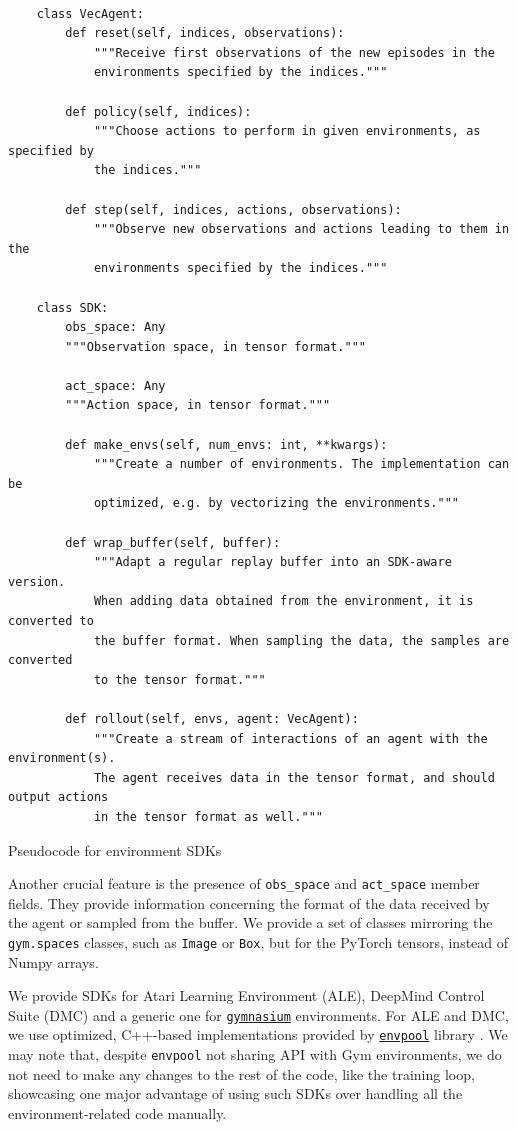 \documentclass[en]{pracamgr}
\begin{document}
\begin{listing}
  \begin{verbatim}

    class VecAgent:
        def reset(self, indices, observations):
            """Receive first observations of the new episodes in the
            environments specified by the indices."""
        
        def policy(self, indices):
            """Choose actions to perform in given environments, as specified by
            the indices."""
        
        def step(self, indices, actions, observations):
            """Observe new observations and actions leading to them in the 
            environments specified by the indices."""

    class SDK:
        obs_space: Any
        """Observation space, in tensor format."""
        
        act_space: Any
        """Action space, in tensor format."""

        def make_envs(self, num_envs: int, **kwargs):
            """Create a number of environments. The implementation can be
            optimized, e.g. by vectorizing the environments."""
        
        def wrap_buffer(self, buffer):
            """Adapt a regular replay buffer into an SDK-aware version.
            When adding data obtained from the environment, it is converted to 
            the buffer format. When sampling the data, the samples are converted
            to the tensor format."""
        
        def rollout(self, envs, agent: VecAgent):
            """Create a stream of interactions of an agent with the environment(s).
            The agent receives data in the tensor format, and should output actions
            in the tensor format as well."""
  \end{verbatim}
  \caption{Pseudocode for environment SDKs}
  \label{lst:env_sdk}
\end{listing}

Another crucial feature is the presence of {\tt obs\_space} and {\tt act\_space} member fields. They provide information concerning the format of the data received by the agent or sampled from the buffer. We provide a set of classes mirroring the {\tt gym.spaces} classes, such as {\tt Image} or {\tt Box}, but for the PyTorch tensors, instead of Numpy arrays.

We provide SDKs for Atari Learning Environment (ALE), DeepMind Control Suite (DMC) and a generic one for \href{https://gymnasium.farama.org/}{\tt gymnasium} environments. For ALE and DMC, we use optimized, C++-based implementations provided by \href{https://github.com/sail-sg/envpool}{\tt envpool} library \autocite{wengEnvPoolHighlyParallel2022}. We may note that, despite {\tt envpool} not sharing API with Gym environments, we do not need to make any changes to the rest of the code, like the training loop, showcasing one major advantage of using such SDKs over handling all the environment-related code manually.
\end{document}
